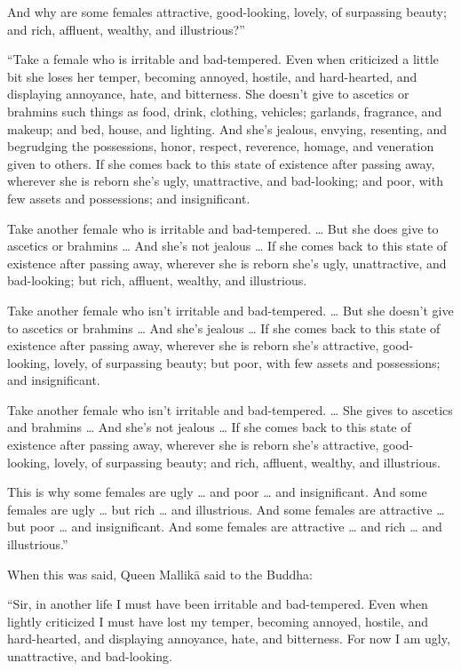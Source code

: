 \documentclass[12pt,openany]{book}%
\begin{document}
And why are some females attractive, good-looking, lovely, of surpassing beauty; and rich, affluent, wealthy, and illustrious?” 

“Take a female who is irritable and bad-tempered. Even when criticized a little bit she loses her temper, becoming annoyed, hostile, and hard-hearted, and displaying annoyance, hate, and bitterness. She doesn’t give to ascetics or brahmins such things as food, drink, clothing, vehicles; garlands, fragrance, and makeup; and bed, house, and lighting. And she’s jealous, envying, resenting, and begrudging the possessions, honor, respect, reverence, homage, and veneration given to others. If she comes back to this state of existence after passing away, wherever she is reborn she’s ugly, unattractive, and bad-looking; and poor, with few assets and possessions; and insignificant. 

Take another female who is irritable and bad-tempered. … But she does give to ascetics or brahmins … And she’s not jealous … If she comes back to this state of existence after passing away, wherever she is reborn she’s ugly, unattractive, and bad-looking; but rich, affluent, wealthy, and illustrious. 

Take another female who isn’t irritable and bad-tempered. … But she doesn’t give to ascetics or brahmins … And she’s jealous … If she comes back to this state of existence after passing away, wherever she is reborn she’s attractive, good-looking, lovely, of surpassing beauty; but poor, with few assets and possessions; and insignificant. 

Take another female who isn’t irritable and bad-tempered. … She gives to ascetics and brahmins … And she’s not jealous … If she comes back to this state of existence after passing away, wherever she is reborn she’s attractive, good-looking, lovely, of surpassing beauty; and rich, affluent, wealthy, and illustrious. 

This is why some females are ugly … and poor … and insignificant. And some females are ugly … but rich … and illustrious. And some females are attractive … but poor … and insignificant. And some females are attractive … and rich … and illustrious.” 

When this was said, Queen \textsanskrit{Mallikā} said to the Buddha: 

“Sir, in another life I must have been irritable and bad-tempered. Even when lightly criticized I must have lost my temper, becoming annoyed, hostile, and hard-hearted, and displaying annoyance, hate, and bitterness. For now I am ugly, unattractive, and bad-looking. 
\end{document}

